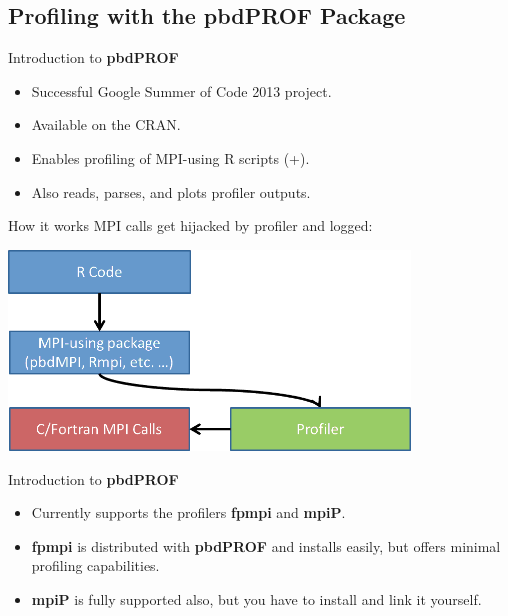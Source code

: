 \subsection{Profiling with the pbdPROF Package}
\makesubcontentsslidessec


\begin{frame}
  \begin{block}{Introduction to \textbf{pbdPROF}}
    \begin{itemize}
    \item Successful Google Summer of Code 2013 project.
    \item Available on the CRAN.
    \item Enables profiling of MPI-using R scripts (+).
    \item Also reads, parses, and plots profiler outputs.
    \end{itemize}
  \end{block}
\end{frame}


\begin{frame}
  \begin{block}{How it works}
    MPI calls get hijacked by profiler and logged:
    \begin{center}
      \hspace{2cm}\includegraphics[width=0.8\textwidth]{../common/pics/prof/mpi_profiler}
    \end{center}
  \end{block}
\end{frame}


\begin{frame}
  \begin{block}{Introduction to \textbf{pbdPROF}}
    \begin{itemize}
    \item Currently supports the profilers \textbf{fpmpi} and \textbf{mpiP}.
    \item \textbf{fpmpi} is distributed with \textbf{pbdPROF} and
      installs easily, but offers minimal profiling capabilities.
    \item \textbf{mpiP} is fully supported also, but you have to
      install and link it yourself.
    \end{itemize}
  \end{block}
\end{frame}
